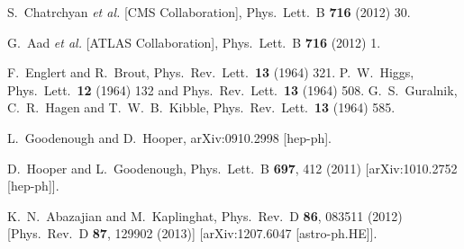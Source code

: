 \documentclass[preprintnumbers,superscriptaddress,nofootinbib,aps,prd,floatfix]{revtex4}
\begin{document}


\begin{thebibliography}{99}


  S.~Chatrchyan {\it et al.}  [CMS Collaboration],
  Phys.\ Lett.\ B {\bf 716} (2012) 30.

  G.~Aad {\it et al.}  [ATLAS Collaboration],
  Phys.\ Lett.\ B {\bf 716} (2012) 1.

  F.~Englert and R.~Brout,
  Phys.\ Rev.\ Lett.\  {\bf 13} (1964) 321.
  P.~W.~Higgs,
  Phys.\ Lett.\  {\bf 12} (1964) 132 and
  Phys.\ Rev.\ Lett.\  {\bf 13} (1964) 508.
  G.~S.~Guralnik, C.~R.~Hagen and T.~W.~B.~Kibble,
  Phys.\ Rev.\ Lett.\  {\bf 13} (1964) 585.



  L.~Goodenough and D.~Hooper,
  arXiv:0910.2998 [hep-ph].


  D.~Hooper and L.~Goodenough,
  Phys.\ Lett.\ B {\bf 697}, 412 (2011)
  [arXiv:1010.2752 [hep-ph]].

  K.~N.~Abazajian and M.~Kaplinghat,
  Phys.\ Rev.\ D {\bf 86}, 083511 (2012)
  [Phys.\ Rev.\ D {\bf 87}, 129902 (2013)]
  [arXiv:1207.6047 [astro-ph.HE]].
  

\end{thebibliography}
\end{document}
